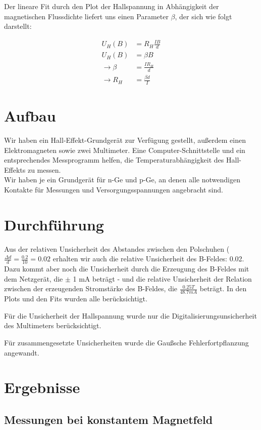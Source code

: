 \documentclass[12pt,a4paper,twopage]{article}
\begin{document}
Der lineare Fit durch den Plot der Hallspannung in Abhängigkeit der magnetischen Flussdichte liefert uns einen Parameter $\beta$, der sich wie folgt darstellt:

\begin{equation}\label{bfit}
\begin{split}
U_H(B)& = R_H \frac{I B}{d} \\
U_H(B)& = \beta B \\
\rightarrow \beta & = \frac{I R_H}{d} \\
\rightarrow R_H & = \frac{\beta d}{I}
\end{split}
\end{equation}



\section{Aufbau}
Wir haben ein Hall-Effekt-Grundgerät zur Verfügung gestellt, außerdem einen Elektromagneten sowie zwei Multimeter. Eine Computer-Schnittstelle und ein entsprechendes Messprogramm helfen, die Temperaturabhängigkeit des Hall-Effekts zu messen.\\
Wir haben je ein Grundgerät für n-Ge und p-Ge, an denen alle notwendigen Kontakte für Messungen und Versorgungsspannungen angebracht sind.

\section{Durchführung}
Aus der relativen Unsicherheit des Abstandes zwischen den Polschuhen ($\frac{\Delta d}{d}= \frac{0.2}{10} = 0.02 $ erhalten wir auch die relative Unsicherheit des B-Feldes:  0.02. Dazu kommt aber noch die Unsicherheit durch die Erzeugung des B-Feldes mit dem Netzgerät, die $\pm$ 1 mA beträgt - und die relative Unsicherheit der Relation zwischen der erzeugenden Stromstärke des B-Feldes, die $\frac{0.25 T}{48.7 mA}$ beträgt. In den Plots und den Fits wurden alle berücksichtigt. 

Für die Unsicherheit der Hallspannung wurde nur die Digitalisierungsunsicherheit des Multimeters berücksichtigt. 

Für zusammengesetzte Unsicherheiten wurde die Gaußsche Fehlerfortpflanzung angewandt.
\section{Ergebnisse}
\subsection*{Messungen bei konstantem Magnetfeld}
\end{document}
